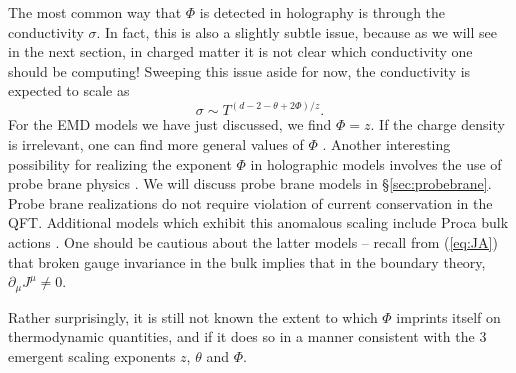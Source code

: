 \documentclass[10pt, oneside]{book}
\begin{document}
\begin{doublespace}
The most common way that $\Phi$ is detected in holography is through the conductivity $\sigma$.   In fact, this is also a slightly subtle issue, because as we will see in the next section, in charged matter it is not clear which conductivity one should be computing!   Sweeping this issue aside for now, the conductivity is expected to scale as \cite{Davison:2015taa} \begin{equation}
\sigma \sim T^{(d-2-\theta+2\Phi)/z}.
\end{equation}
For the EMD models we have just discussed, we find $\Phi=z$.    If the charge density is irrelevant, one can find more general values of $\Phi$ \cite{Gouteraux:2012yr}.   Another interesting possibility for realizing the exponent $\Phi$ in holographic models involves the use of probe brane physics \cite{Karch:2014mba}.   We will discuss probe brane models in \S \ref{sec:probebrane}.   Probe brane realizations do not require violation of current conservation in the QFT.   Additional models which exhibit this anomalous scaling include Proca bulk actions \cite{Gouteraux:2012yr}.   One should be cautious about the latter models -- recall from (\ref{eq:JA}) that broken gauge invariance in the bulk implies that in the boundary theory,  $\partial_\mu J^\mu \ne 0$.

Rather surprisingly, it is still not known the extent to which $\Phi$ imprints itself on thermodynamic quantities, and if it does so in a manner consistent with the 3 emergent scaling exponents $z$, $\theta$ and $\Phi$.

%
%




\end{doublespace}
\end{document}
